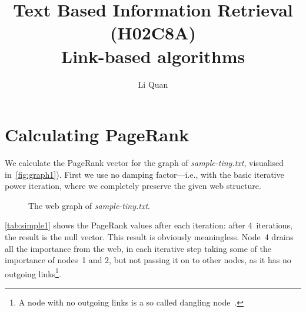 \documentclass[a4paper,english,11pt]{scrartcl}
\title{Text Based Information Retrieval (H02C8A) \\Link-based algorithms}
\author{Li Quan}
\begin{document}
\maketitle


\section{Calculating PageRank}

We calculate the PageRank vector for the graph of \emph{sample-tiny.txt}, visualised in~\autoref{fig:graph1}). First we use no damping factor---i.e., with the basic iterative power iteration, where we completely preserve the given web structure.


\begin{figure}[hbpt]\footnotesize
 \begin{center}
 
\end{center}
\caption{The web graph of \emph{sample-tiny.txt}.\label{fig:graph1}}
\end{figure}

\autoref{tab:simple1} shows the PageRank values after each iteration: after 4~iterations, the result is the null vector. This result is obviously meaningless. Node~4 drains all the importance from the web, in each iterative step taking some of the importance of nodes~1 and 2, but not passing it on to other nodes, as it has no outgoing links\footnote{A node with no outgoing links is a so called dangling node~\cite{ams}.}.
\end{document}
